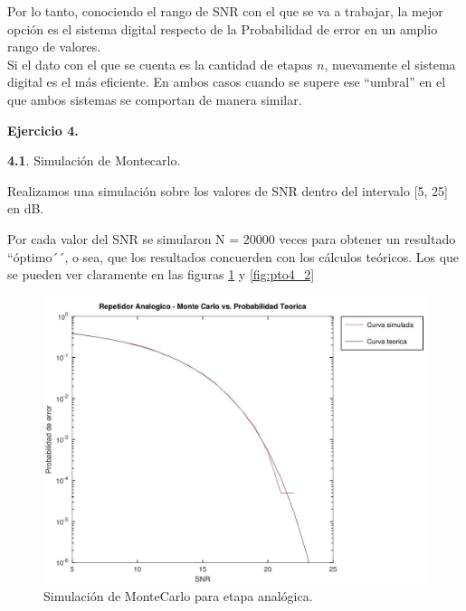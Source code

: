 Por lo tanto, conociendo el rango de SNR con el que se va a trabajar, la mejor opción es el sistema digital respecto de la Probabilidad de error en un amplio rango de valores.\\
Si el dato con el que se cuenta es la cantidad de etapas $n$, nuevamente el sistema digital es el más eficiente. En ambos casos cuando se supere ese ``umbral'' en el que ambos sistemas se comportan de manera similar.




\textbf{Ejercicio 4.}

\textbf{4.1}. Simulación de Montecarlo.

Realizamos una simulación sobre los valores de SNR dentro del intervalo  [5, 25] en dB.

Por cada valor del SNR se simularon N = 20000 veces para obtener un resultado ``óptimo´´, o sea, que los resultados concuerden con los cálculos teóricos. Los que se pueden ver claramente en las figuras \ref{fig:pto4_1} y \ref{fig:pto4_2}

\begin{figure}[H]
  \centering
  \includegraphics[width=1\textwidth]{images/Pe_pto4_1}
  \caption{Simulación de MonteCarlo para etapa analógica.}
  \label{fig:pto4_1}
\end{figure}

